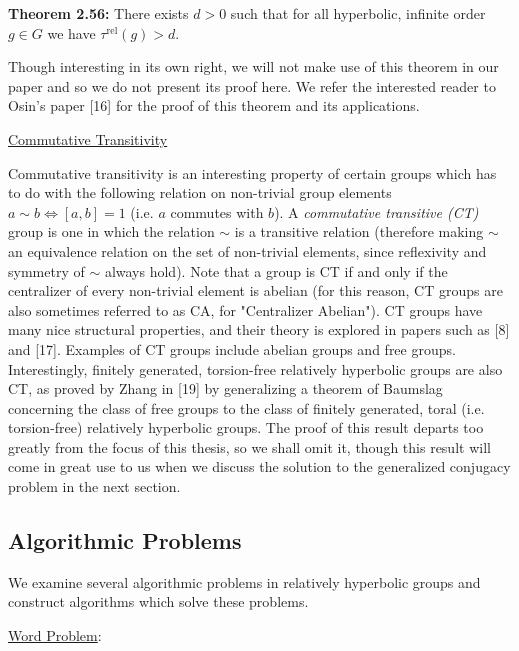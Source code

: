 \documentclass[12pt]{article}
\newcommand{\vs}{\vskip10pt}
\begin{document}
	\vs 
	
	\textbf{Theorem 2.56: } There exists $d > 0$ such that for all hyperbolic, infinite order $g \in G$ we have $\tau^{\text{rel}}(g) > d$. 
	
	\vs 
	
	Though interesting in its own right, we will not make use of this theorem in our paper and so we do not present its proof here. We refer the interested reader to Osin's paper [16] for the proof of this theorem and its applications. 
	
	\vs 
	
	\underline{Commutative Transitivity}
	
	\vs 
	
	Commutative transitivity is an interesting property of certain groups which has to do with the following relation on non-trivial group elements $a \sim b \iff [a,b] = 1$ (i.e. $a$ commutes with $b$). A \textit{commutative transitive (CT)} group is one in which the relation $\sim$ is a transitive relation (therefore making $\sim$ an equivalence relation on the set of non-trivial elements, since reflexivity and symmetry of $\sim$ always hold). Note that a group is CT if and only if the centralizer of every non-trivial element is abelian (for this reason, CT groups are also sometimes referred to as CA, for "Centralizer Abelian"). CT groups have many nice structural properties, and their theory is explored in papers such as [8] and [17]. Examples of CT groups include abelian groups and free groups. Interestingly, finitely generated, torsion-free relatively hyperbolic groups are also CT, as proved by Zhang in [19] by generalizing a theorem of Baumslag concerning the class of free groups to the class of finitely generated, toral (i.e. torsion-free) relatively hyperbolic groups. The proof of this result departs too greatly from the focus of this thesis, so we shall omit it, though this result will come in great use to us when we discuss the solution to the generalized conjugacy problem in the next section. 
		
		
		\newpage
	\subsection{Algorithmic Problems}
	
	We examine several algorithmic problems in relatively hyperbolic groups and construct algorithms which solve these problems. 
	
	\vs 
	
	\underline{Word Problem}: 
	
\end{document}
